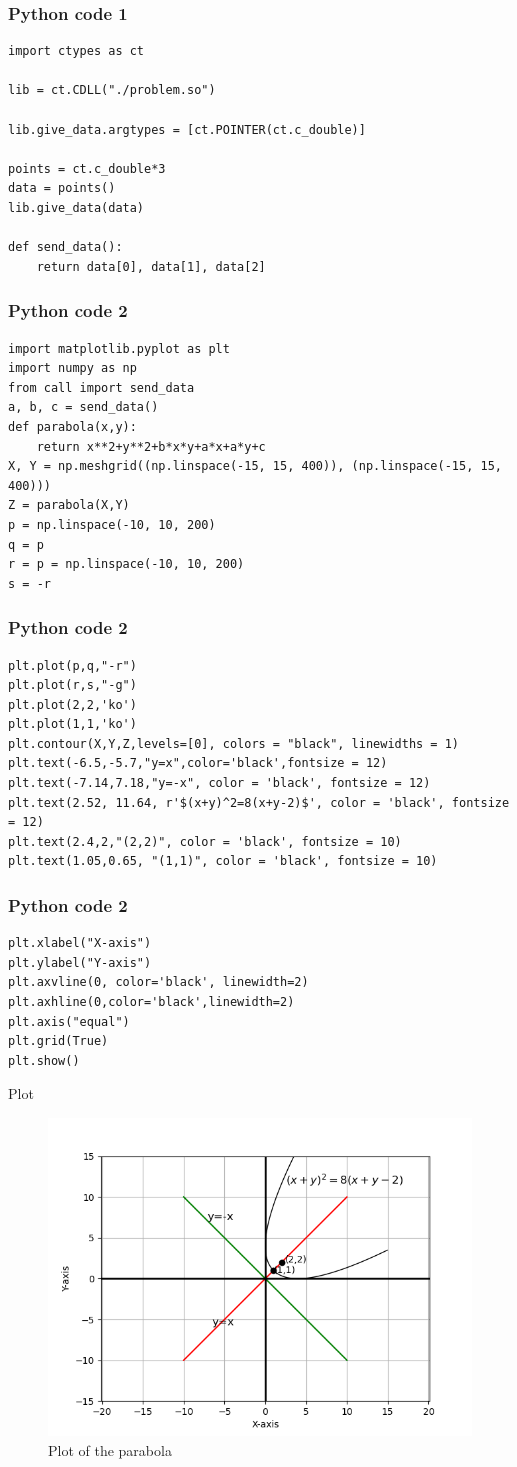\documentclass{beamer}
\begin{document}
\begin{frame}[fragile]
    \frametitle{Python code 1}
    \begin{lstlisting}
import ctypes as ct

lib = ct.CDLL("./problem.so")

lib.give_data.argtypes = [ct.POINTER(ct.c_double)]

points = ct.c_double*3
data = points()
lib.give_data(data)

def send_data():
    return data[0], data[1], data[2]
    \end{lstlisting}
\end{frame}

\begin{frame}[fragile]
    \frametitle{Python code 2}
    \begin{lstlisting}
import matplotlib.pyplot as plt
import numpy as np
from call import send_data
a, b, c = send_data()
def parabola(x,y):
    return x**2+y**2+b*x*y+a*x+a*y+c
X, Y = np.meshgrid((np.linspace(-15, 15, 400)), (np.linspace(-15, 15, 400)))
Z = parabola(X,Y)
p = np.linspace(-10, 10, 200)
q = p
r = p = np.linspace(-10, 10, 200)
s = -r
    \end{lstlisting}
\end{frame}

\begin{frame}[fragile]
    \frametitle{Python code 2}
    \begin{lstlisting}
plt.plot(p,q,"-r")
plt.plot(r,s,"-g")
plt.plot(2,2,'ko')
plt.plot(1,1,'ko')
plt.contour(X,Y,Z,levels=[0], colors = "black", linewidths = 1)
plt.text(-6.5,-5.7,"y=x",color='black',fontsize = 12)
plt.text(-7.14,7.18,"y=-x", color = 'black', fontsize = 12)
plt.text(2.52, 11.64, r'$(x+y)^2=8(x+y-2)$', color = 'black', fontsize = 12)
plt.text(2.4,2,"(2,2)", color = 'black', fontsize = 10)
plt.text(1.05,0.65, "(1,1)", color = 'black', fontsize = 10)
    \end{lstlisting}
\end{frame}

\begin{frame}[fragile]
    \frametitle{Python code 2}
    \begin{lstlisting}
plt.xlabel("X-axis")
plt.ylabel("Y-axis")
plt.axvline(0, color='black', linewidth=2)
plt.axhline(0,color='black',linewidth=2)
plt.axis("equal")
plt.grid(True)
plt.show()
    \end{lstlisting}
\end{frame}

\begin{frame}{Plot}
    \begin{figure}
        \centering
        \includegraphics[width=0.5\columnwidth]{../figs/plot.png}
        \caption{Plot of the parabola}
        \label{fig:fig}
    \end{figure}
\end{frame}
\end{document}
